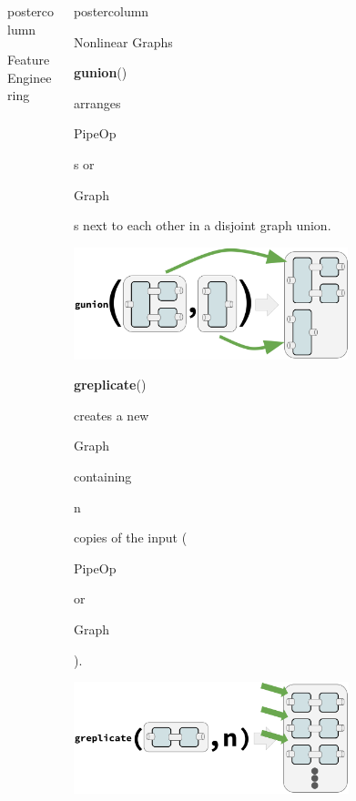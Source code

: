 \documentclass{beamer}
\newlength{\columnheight} %
\newcommand{\codeinline}[1]{\begin{codeboxinline}#1\end{codeboxinline}}
\begin{document}
\begin{frame}[fragile]{}
\begin{columns}
\begin{column}{.245\textwidth}
\begin{beamercolorbox}[center]{postercolumn}
\begin{minipage}{.98\textwidth}
{\begin{myblock}{Feature Engineering}
\begin{codeboxexample}
{            }
            \end{codeboxexample}
            \end{myblock}
              \vspace{-1.0em}
       			\vfill}
				\end{minipage}
			\end{beamercolorbox}
		\end{column}
    \begin{column}{.245\textwidth}
			\begin{beamercolorbox}[center]{postercolumn}
				\begin{minipage}{.98\textwidth}
					\parbox[t][\columnheight]{\textwidth}{
            \begin{myblock}{Nonlinear Graphs}
              \vspace{-0.5em}
              \codeinline{\textbf{gunion}()} arranges \codeinline{PipeOp}s or \codeinline{Graph}s next to each other in a disjoint graph union.
              \begin{center}
                \includegraphics[width=0.7\textwidth]{img/gunion.pdf}
              \end{center}
              \vspace{0.3em}
              \codeinline{\textbf{greplicate}()} creates a new \codeinline{Graph} containing \codeinline{n} copies of the input (\codeinline{PipeOp} or \codeinline{Graph}).
              \begin{center}
                \includegraphics[width=0.7\textwidth]{img/greplicate.pdf}

\end{center}
\end{myblock}}
\end{minipage}
\end{beamercolorbox}
\end{column}
\end{columns}
\end{frame}
\end{document}
